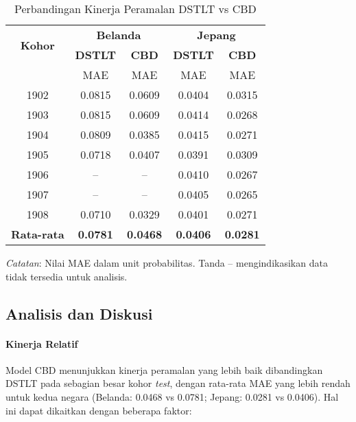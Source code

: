 \begin{table}[htbp]
\centering
\caption{Perbandingan Kinerja Peramalan DSTLT vs CBD}
\label{tab:forecasting_performance}
\small
\begin{tabular}{ccccc}
\hline
\multirow{2}{*}{\textbf{Kohor}} & \multicolumn{2}{c}{\textbf{Belanda}} & \multicolumn{2}{c}{\textbf{Jepang}} \\
\cline{2-5}
& \textbf{DSTLT} & \textbf{CBD} & \textbf{DSTLT} & \textbf{CBD} \\
& MAE & MAE & MAE & MAE \\
\hline
1902 & 0.0815 & 0.0609 & 0.0404 & 0.0315 \\
1903 & 0.0815 & 0.0609 & 0.0414 & 0.0268 \\
1904 & 0.0809 & 0.0385 & 0.0415 & 0.0271 \\
1905 & 0.0718 & 0.0407 & 0.0391 & 0.0309 \\
1906 & -- & -- & 0.0410 & 0.0267 \\
1907 & -- & -- & 0.0405 & 0.0265 \\
1908 & 0.0710 & 0.0329 & 0.0401 & 0.0271 \\
\hline
\textbf{Rata-rata} & \textbf{0.0781} & \textbf{0.0468} & \textbf{0.0406} & \textbf{0.0281} \\
\hline
\end{tabular}
\begin{tablenotes}
\small
\item \textit{Catatan}: Nilai MAE dalam unit probabilitas. Tanda -- mengindikasikan data tidak tersedia untuk analisis.
\end{tablenotes}
\end{table}

\subsection{Analisis dan Diskusi}

\paragraph{Kinerja Relatif}
Model CBD menunjukkan kinerja peramalan yang lebih baik dibandingkan DSTLT pada sebagian besar kohor \textit{test}, dengan rata-rata MAE yang lebih rendah untuk kedua negara (Belanda: 0.0468 vs 0.0781; Jepang: 0.0281 vs 0.0406). Hal ini dapat dikaitkan dengan beberapa faktor:

